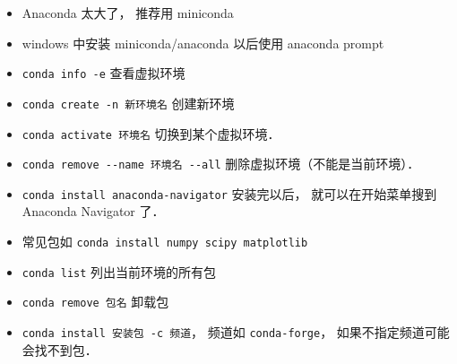 
\begin{itemize}
\item Anaconda 太大了， 推荐用 miniconda
\item windows 中安装 miniconda/anaconda 以后使用 anaconda prompt
\item \verb|conda info -e| 查看虚拟环境
\item \verb|conda create -n 新环境名| 创建新环境
\item \verb|conda activate 环境名| 切换到某个虚拟环境．
\item \verb|conda remove --name 环境名 --all| 删除虚拟环境（不能是当前环境）．
\item \verb|conda install anaconda-navigator| 安装完以后， 就可以在开始菜单搜到 Anaconda Navigator 了．
\item 常见包如 \verb|conda install numpy scipy matplotlib|
\item \verb|conda list| 列出当前环境的所有包
\item \verb|conda remove 包名| 卸载包
\item \verb|conda install 安装包 -c 频道|， 频道如 \verb|conda-forge|， 如果不指定频道可能会找不到包．
\end{itemize}

